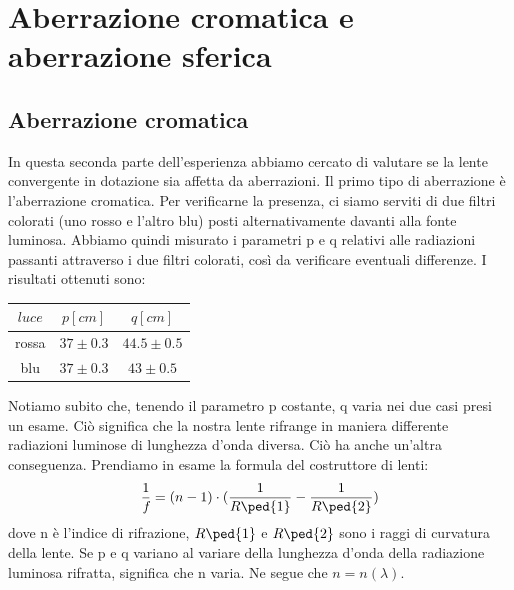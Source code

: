 \documentclass[a4paper,11pt]{article}
\begin{document}
\section{Aberrazione cromatica e aberrazione sferica}
\subsection{Aberrazione cromatica}
In questa seconda parte dell'esperienza abbiamo cercato di valutare se la lente convergente in dotazione sia affetta da aberrazioni. Il primo tipo di aberrazione è l'aberrazione cromatica. Per verificarne la presenza, ci siamo serviti di due filtri colorati (uno rosso e l'altro blu) posti alternativamente davanti alla fonte luminosa. Abbiamo quindi misurato i parametri p e q relativi alle radiazioni passanti attraverso i due filtri colorati, così da verificare eventuali differenze. I risultati ottenuti sono:\\
\begin{center}
\begin{tabular}{|c|c|c|}
\hline $luce$ & $p [cm]$ & $q [cm]$ \\ 
\hline rossa & $37\pm 0.3$ & $44.5 \pm 0.5$ \\ 
\hline blu & $37\pm 0.3$ & $43 \pm 0.5$ \\ 
\hline 
\end{tabular}  
\end{center}
Notiamo subito che, tenendo il parametro p costante, q varia nei due casi presi un esame. Ciò significa che la nostra lente rifrange in maniera differente radiazioni luminose di lunghezza d'onda diversa. Ciò ha anche un'altra conseguenza. Prendiamo in esame la formula del costruttore di lenti: $$\frac{1}{\textit{f}}=(n-1)\cdot (\frac{1}{R \ped{1}}-\frac{1}{R \ped{2}})$$
dove n è l'indice di rifrazione, $R\ped{1}$ e $R\ped{2}$ sono i raggi di curvatura della lente. Se p e q variano al variare della lunghezza d'onda della radiazione luminosa rifratta, significa che n varia. Ne segue che $n=n(\lambda)$.
\end{document}
